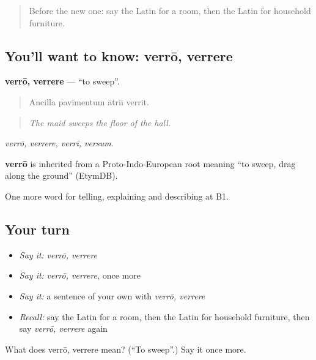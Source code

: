 \begin{quote}
Before the new one: say the Latin for a room, then the Latin for household furniture.
\end{quote}

\subsection*{You'll want to know: verrō, verrere}
\textbf{verrō, verrere} — \textquotedblleft{}to sweep\textquotedblright{}.

\begin{quote}
Ancilla pavīmentum ātriī verrit.
\end{quote}

\begin{quote}
\emph{The maid sweeps the floor of the hall.}
\end{quote}

\emph{verrō, verrere, verrī, versum}.

\begin{cousinweb}
\textbf{verrō} is inherited from a Proto-Indo-European root meaning \textquotedblleft{}to sweep, drag along the ground\textquotedblright{} (EtymDB).
\end{cousinweb}

\begin{grammarlens}[title={What you've built}]
One more word for telling, explaining and describing at B1.
\end{grammarlens}

\subsection*{Your turn}
\begin{itemize}
\raggedright
  \item \emph{Say it:} \emph{verrō, verrere}
  \item \emph{Say it:} \emph{verrō, verrere}, once more
  \item \emph{Say it:} a sentence of your own with \emph{verrō, verrere}
  \item \emph{Recall:} say the Latin for a room, then the Latin for household furniture, then say \emph{verrō, verrere} again
\end{itemize}

\begin{tcolorbox}[breakable,colback=teal!4,colframe=teal!35!black,title={Before you move on}]
What does verrō, verrere mean? (\textquotedblleft{}To sweep\textquotedblright{}.) Say it once more.
\end{tcolorbox}
